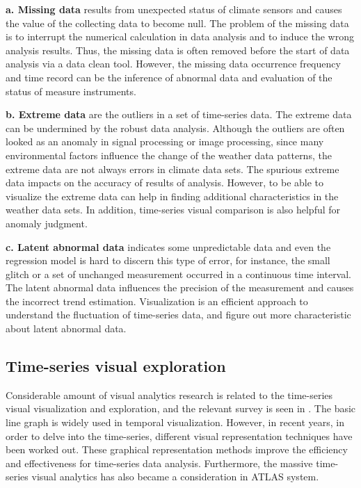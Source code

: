 \documentclass{vgtc}                          %
\begin{document}
{\bf a. Missing data} results from unexpected status of climate sensors and causes the value of the collecting data to become null. The problem of the missing data is to interrupt the numerical calculation in data analysis and to induce the wrong analysis results. Thus, the missing data is often removed before the start of data analysis via a data clean tool. However, the missing data occurrence frequency and time record can be the inference of abnormal data and evaluation of the status of measure instruments. 

{\bf b. Extreme data} are the outliers \cite{rousseeuw2005robust}in a set of time-series data. The extreme data can be undermined by the robust data analysis. Although the outliers are often looked as an anomaly in signal processing or image processing, since many environmental factors influence the change of the weather data patterns, the extreme data are not always errors in climate data sets. The spurious extreme data impacts on the accuracy of results of analysis. However, to be able to visualize the extreme data can help in finding additional characteristics in the weather data sets. In addition, time-series visual comparison is also helpful for anomaly judgment.
 
{\bf c. Latent abnormal data} indicates some unpredictable data and even the regression model is hard to discern this type of error, for instance, the small glitch or a set of unchanged measurement occurred in a continuous time interval. The latent abnormal data influences the precision of the measurement and causes the incorrect trend estimation. Visualization is an efficient approach to understand the fluctuation of time-series data, and figure out more characteristic about latent abnormal data.

\subsection{Time-series visual exploration}

Considerable amount of visual analytics research is related to the time-series visual visualization and exploration, and the relevant survey is seen in \cite{silva2000visualization}. The basic line graph \cite{tufte1983visual} is widely used in temporal visualization. However, in recent years, in order to delve into the time-series, different visual representation techniques have been worked out\cite{bremm2011interactive,mclachlan2008liverac,javed2010stack,Sip2012,Liao2010,Liao2011}. These graphical representation methods improve the efficiency and effectiveness for time-series data analysis. Furthermore, the massive time-series visual analytics has also became a consideration in ATLAS \cite{chan2008maintaining} system.
 
\end{document}
